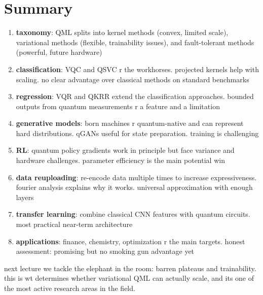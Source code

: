 \documentclass[11pt,a4paper]{article}
\theoremstyle{definition}
\theoremstyle{remark}
\begin{document}
\section{Summary}

\begin{enumerate}[label=\arabic*.]
    \item \textbf{taxonomy}: QML splits into kernel methods (convex, limited scale), variational methods (flexible, trainability issues), and fault-tolerant methods (powerful, future hardware)

    \item \textbf{classification}: VQC and QSVC r the workhorses. projected kernels help with scaling. no clear advantage over classical methods on standard benchmarks

    \item \textbf{regression}: VQR and QKRR extend the classification approaches. bounded outputs from quantum measurements r a feature and a limitation

    \item \textbf{generative models}: born machines r quantum-native and can represent hard distributions. qGANs useful for state preparation. training is challenging

    \item \textbf{RL}: quantum policy gradients work in principle but face variance and hardware challenges. parameter efficiency is the main potential win

    \item \textbf{data reuploading}: re-encode data multiple times to increase expressiveness. fourier analysis explains why it works. universal approximation with enough layers

    \item \textbf{transfer learning}: combine classical CNN features with quantum circuits. most practical near-term architecture

    \item \textbf{applications}: finance, chemistry, optimization r the main targets. honest assessment: promising but no smoking gun advantage yet
\end{enumerate}

next lecture we tackle the elephant in the room: barren plateaus and trainability. this is wt determines whether variational QML can actually scale, and its one of the most active research areas in the field.
\end{document}
